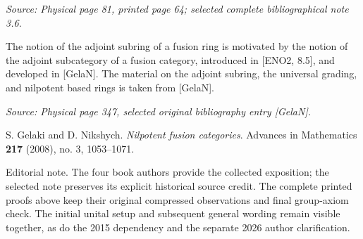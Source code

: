 \documentclass[11pt]{article}
\newcommand{\sourceloc}[1]{\par\smallskip\noindent\textit{Source: #1.}\par\nopagebreak[4]\smallskip}
\newcommand{\editorial}[1]{\par\smallskip\noindent\textsf{Editorial note.} #1\par\smallskip}
\begin{document}
\sourceloc{Physical page 81, printed page 64; selected complete bibliographical note 3.6}
The notion of the adjoint subring of a fusion ring is motivated by the
notion of the adjoint subcategory of a fusion category, introduced in
[ENO2, 8.5], and developed in [GelaN]. The material on the adjoint subring,
the universal grading, and nilpotent based rings is taken from [GelaN].

\sourceloc{Physical page 347, selected original bibliography entry [GelaN]}
\noindent[GelaN] S. Gelaki and D. Nikshych. \emph{Nilpotent fusion categories}.
Advances in Mathematics \textbf{217} (2008), no. 3, 1053--1071.

\editorial{The four book authors provide the collected exposition;
the selected note preserves its explicit historical source credit.
The complete printed proofs above keep their original compressed
observations and final group-axiom check. The initial unital setup
and subsequent general wording remain visible together, as do the
2015 dependency and the separate 2026 author clarification.}
\end{document}
